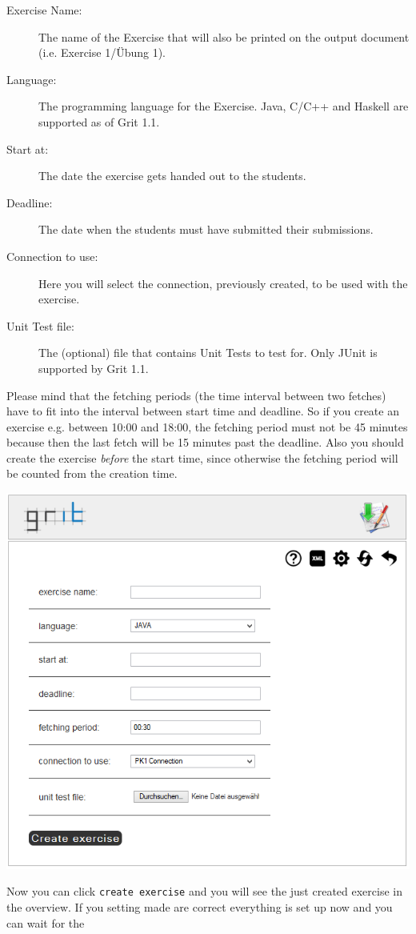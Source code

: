 \documentclass[10pt,a4paper, titlepage, toc=idx]{scrreprt}
\theoremstyle{definition}
\theoremstyle{plain}
\newcommand*{\product}{Grit}
\newcommand*{\version}{1.1}
\begin{document}
	\begin{description}
        \item[Exercise Name:] The name of the Exercise that will also
          be printed on the output document (i.e. Exercise 1/Übung 1).
        \item[Language:] The programming language for the
          Exercise. Java, C/C++ and Haskell are supported as of
          \product{} \version.
        \item[Start at:] The date the exercise gets handed out to the
          students.
        \item[Deadline:] The date when the students must have
          submitted their submissions.
        \item[Connection to use:] Here you will select the connection,
          previously created, to be used with the exercise.
        \item[Unit Test file:] The (optional) file that contains Unit
          Tests to test for. Only JUnit is supported by \product{}
          \version.
	\end{description}
Please mind that the fetching periods (the time interval between two fetches) have to fit into the interval
between start time and deadline. So if you create an exercise e.g.
between 10:00 and 18:00, the fetching period must not be 45 minutes
because then the last fetch will be 15 minutes past the deadline. 
Also you should create the exercise \emph{before} the start time, 
since otherwise the fetching period will be counted from the creation time.
	\begin{center}
          \includegraphics[width=.55\textwidth]{pictures/create_exercise.png}
	\end{center}
	Now you can click {\tt create exercise} and you will see the
        just created exercise in the overview. If you setting made are
        correct everything is set up now and you can wait for the
\end{document}
